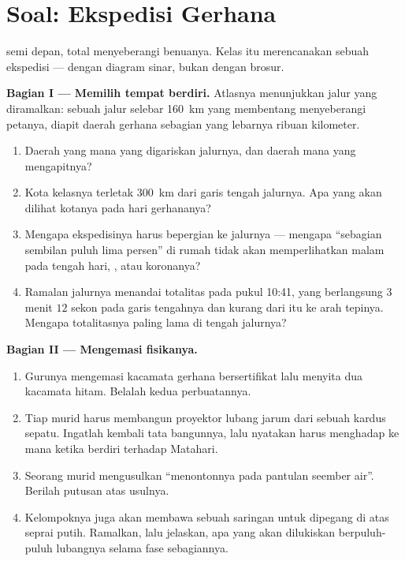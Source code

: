 \section{Soal: Ekspedisi Gerhana}

\begin{problem}\label{pb:g7:shadows-eclipses:1}
 semi depan,  total menyeberangi benuanya. Kelas
itu merencanakan sebuah ekspedisi --- dengan diagram sinar, bukan
dengan brosur.

\medskip\noindent\textbf{Bagian I --- Memilih tempat berdiri.}
Atlasnya menunjukkan jalur yang diramalkan: sebuah jalur selebar
\qty{160}{km} yang membentang menyeberangi petanya, diapit daerah
gerhana sebagian yang lebarnya ribuan kilometer.
\begin{enumerate}
  \item Daerah  yang mana yang digariskan jalurnya, dan
        daerah mana yang mengapitnya?
  \item Kota kelasnya terletak \qty{300}{km} dari garis tengah
        jalurnya. Apa yang akan dilihat kotanya pada hari gerhananya?
  \item Mengapa ekspedisinya harus bepergian ke jalurnya --- mengapa
        ``sebagian sembilan puluh lima persen'' di rumah tidak akan
        memperlihatkan malam pada tengah hari, , atau koronanya?
  \item Ramalan jalurnya menandai totalitas pada pukul 10:41, yang
        berlangsung $3$ menit $12$ sekon pada garis tengahnya dan
        kurang dari itu ke arah tepinya. Mengapa totalitasnya paling
        lama di tengah jalurnya?
\end{enumerate}

\medskip\noindent\textbf{Bagian II --- Mengemasi fisikanya.}
\begin{enumerate}[resume]
  \item Gurunya mengemasi kacamata gerhana bersertifikat lalu menyita
        dua kacamata hitam. Belalah kedua perbuatannya.
  \item Tiap murid harus membangun proyektor lubang jarum dari sebuah
        kardus sepatu. Ingatlah kembali tata bangunnya, lalu nyatakan
        harus menghadap ke mana ketika berdiri terhadap Matahari.
  \item Seorang murid mengusulkan ``menontonnya pada pantulan seember
        air''. Berilah putusan atas usulnya.
  \item Kelompoknya juga akan membawa sebuah saringan untuk dipegang
        di atas seprai putih. Ramalkan, lalu jelaskan, apa yang akan
        dilukiskan berpuluh-puluh lubangnya selama fase sebagiannya.
\end{enumerate}


\end{problem}
